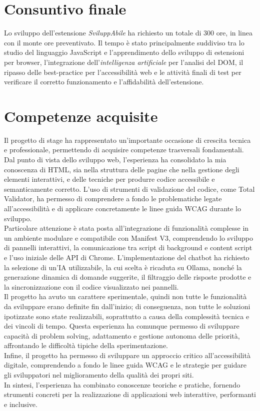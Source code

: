 \section{Consuntivo finale}
\noindent Lo sviluppo dell’estensione \textit{SviluppAbile} ha richiesto un totale di 300 ore, in linea con il monte ore preventivato. Il tempo è stato principalmente suddiviso tra lo studio del linguaggio JavaScript e l’apprendimento dello sviluppo di estensioni per browser, l’integrazione dell'\textit{intelligenza artificiale} per l’analisi del DOM, il ripasso delle best-practice per l'accessibilità web e le attività finali di test per verificare il corretto funzionamento e l’affidabilità dell’estensione. 

\section{Competenze acquisite}
\noindent Il progetto di stage ha rappresentato un’importante occasione di crescita tecnica e professionale, permettendo di acquisire competenze trasversali fondamentali. Dal punto di vista dello sviluppo web, l’esperienza ha consolidato la mia conoscenza di HTML, sia nella struttura delle pagine che nella gestione degli elementi interattivi, e delle tecniche per produrre codice accessibile e semanticamente corretto. L’uso di strumenti di validazione del codice, come Total Validator, ha permesso di comprendere a fondo le problematiche legate all’accessibilità e di applicare concretamente le linee guida WCAG durante lo sviluppo.\\
Particolare attenzione è stata posta all’integrazione di funzionalità complesse in un ambiente modulare e compatibile con Manifest V3, comprendendo lo sviluppo di pannelli interattivi, la comunicazione tra script di background e content script e l’uso iniziale delle API di Chrome. L’implementazione del chatbot ha richiesto la selezione di un’IA utilizzabile, la cui scelta è ricaduta su Ollama, nonché la generazione dinamica di domande suggerite, il filtraggio delle risposte prodotte e la sincronizzazione con il codice visualizzato nei pannelli.\\
Il progetto ha avuto un carattere sperimentale, quindi non tutte le funzionalità da sviluppare erano definite fin dall’inizio; di conseguenza, non tutte le soluzioni ipotizzate sono state realizzabili, soprattutto a causa della complessità tecnica e dei vincoli di tempo. Questa esperienza ha comunque permesso di sviluppare capacità di problem solving, adattamento e gestione autonoma delle priorità, affrontando le difficoltà tipiche della sperimentazione.\\
Infine, il progetto ha permesso di sviluppare un approccio critico all’accessibilità digitale, comprendendo a fondo le linee guida WCAG e le strategie per guidare gli sviluppatori nel miglioramento della qualità dei propri siti. 
\\In sintesi, l’esperienza ha combinato conoscenze teoriche e pratiche, fornendo strumenti concreti per la realizzazione di applicazioni web interattive, performanti e inclusive.

